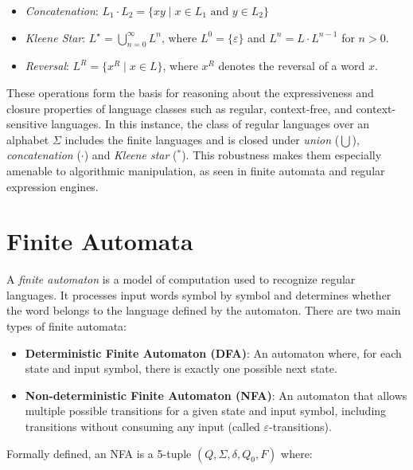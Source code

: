 \begin{itemize}
	\item \emph{Concatenation}: $L_1 \cdot L_2 = \{ xy \mid x \in L_1 \text{ and } y \in L_2 \}$
	\item \emph{Kleene Star}: $L^\star = \bigcup_{n=0}^{\infty} L^n$, where $L^0 = \{\varepsilon\}$ and $L^n = L \cdot L^{n-1}$ for $n > 0$.
	\item \emph{Reversal}: $L^R = \{ x^R \mid x \in L \}$, where $x^R$ denotes the reversal of a word $x$.
\end{itemize}

These operations form the basis for reasoning about the expressiveness and closure properties of language classes such as regular, context-free, and context-sensitive languages.
In this instance, the class of regular languages over an alphabet $\Sigma$ includes the finite languages and is closed under \emph{union} ($\bigcup$), \emph{concatenation} ($\cdot$) and \emph{Kleene star} ($^*$).
This robustness makes them especially amenable to algorithmic manipulation, as seen in finite automata and regular expression engines.

\section{Finite Automata}
A \emph{finite automaton} is a model of computation used to recognize regular languages. It processes input words symbol by symbol and determines whether the word belongs to the language defined by the automaton. There are two main types of finite automata:

\begin{itemize}
    \item \textbf{Deterministic Finite Automaton (DFA)}: An automaton where, for each state and input symbol, there is exactly one possible next state.
    \item \textbf{Non-deterministic Finite Automaton (NFA)}: An automaton that allows multiple possible transitions for a given state and input symbol, including transitions without consuming any input (called $\varepsilon$-transitions).
\end{itemize}

Formally defined, an NFA is a 5-tuple $(Q, \Sigma, \delta, Q_0, F)$ where:

